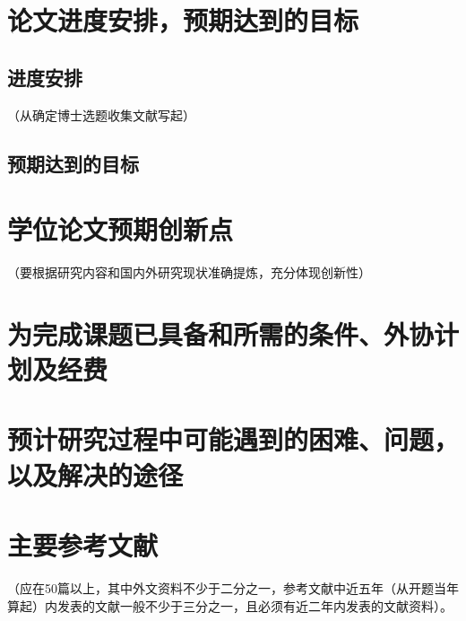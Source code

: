 \documentclass[doctype=proposal,printmode=final]{sysuthesis}
\begin{document}
\section{论文进度安排，预期达到的目标}
\subsection{进度安排}
（从确定博士选题收集文献写起）
\subsection{预期达到的目标}

\section{学位论文预期创新点}
（要根据研究内容和国内外研究现状准确提炼，充分体现创新性）

\section{为完成课题已具备和所需的条件、外协计划及经费}

\section{预计研究过程中可能遇到的困难、问题，以及解决的途径}

\section{主要参考文献}
（应在50篇以上，其中外文资料不少于二分之一，参考文献中近五年（从开题当年算起）内发表的文献一般不少于三分之一，且必须有近二年内发表的文献资料）。




\cleardoublepage
\end{document}
